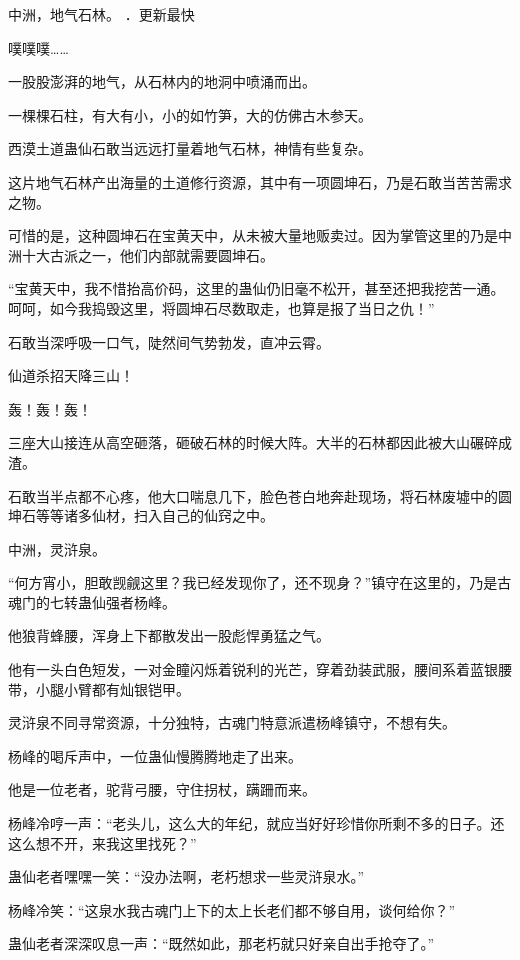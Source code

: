
\begin{this_body}

中洲，地气石林。 ．更新最快

噗噗噗……

一股股澎湃的地气，从石林内的地洞中喷涌而出。

一棵棵石柱，有大有小，小的如竹笋，大的仿佛古木参天。

西漠土道蛊仙石敢当远远打量着地气石林，神情有些复杂。

这片地气石林产出海量的土道修行资源，其中有一项圆坤石，乃是石敢当苦苦需求之物。

可惜的是，这种圆坤石在宝黄天中，从未被大量地贩卖过。因为掌管这里的乃是中洲十大古派之一，他们内部就需要圆坤石。

“宝黄天中，我不惜抬高价码，这里的蛊仙仍旧毫不松开，甚至还把我挖苦一通。呵呵，如今我捣毁这里，将圆坤石尽数取走，也算是报了当日之仇！”

石敢当深呼吸一口气，陡然间气势勃发，直冲云霄。

仙道杀招天降三山！

轰！轰！轰！

三座大山接连从高空砸落，砸破石林的时候大阵。大半的石林都因此被大山碾碎成渣。

石敢当半点都不心疼，他大口喘息几下，脸色苍白地奔赴现场，将石林废墟中的圆坤石等等诸多仙材，扫入自己的仙窍之中。

中洲，灵浒泉。

“何方宵小，胆敢觊觎这里？我已经发现你了，还不现身？”镇守在这里的，乃是古魂门的七转蛊仙强者杨峰。

他狼背蜂腰，浑身上下都散发出一股彪悍勇猛之气。

他有一头白色短发，一对金瞳闪烁着锐利的光芒，穿着劲装武服，腰间系着蓝银腰带，小腿小臂都有灿银铠甲。

灵浒泉不同寻常资源，十分独特，古魂门特意派遣杨峰镇守，不想有失。

杨峰的喝斥声中，一位蛊仙慢腾腾地走了出来。

他是一位老者，驼背弓腰，守住拐杖，蹒跚而来。

杨峰冷哼一声：“老头儿，这么大的年纪，就应当好好珍惜你所剩不多的日子。还这么想不开，来我这里找死？”

蛊仙老者嘿嘿一笑：“没办法啊，老朽想求一些灵浒泉水。”

杨峰冷笑：“这泉水我古魂门上下的太上长老们都不够自用，谈何给你？”

蛊仙老者深深叹息一声：“既然如此，那老朽就只好亲自出手抢夺了。”


\end{this_body}
